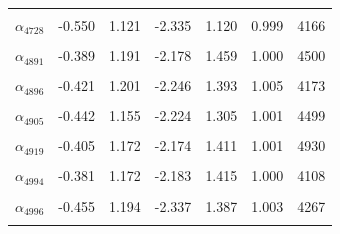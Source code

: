 \begin{longtable}{lrrrrrr}
\cellcolor{gray!10}{$\alpha_{4721}$} & \cellcolor{gray!10}{0.093} & \cellcolor{gray!10}{1.314} & \cellcolor{gray!10}{-1.688} & \cellcolor{gray!10}{2.359} & \cellcolor{gray!10}{1.003} & \cellcolor{gray!10}{1751}\\
$\alpha_{4728}$ & -0.550 & 1.121 & -2.335 & 1.120 & 0.999 & 4166\\
\cellcolor{gray!10}{$\alpha_{4885}$} & \cellcolor{gray!10}{-0.410} & \cellcolor{gray!10}{1.205} & \cellcolor{gray!10}{-2.245} & \cellcolor{gray!10}{1.421} & \cellcolor{gray!10}{1.002} & \cellcolor{gray!10}{4376}\\
$\alpha_{4891}$ & -0.389 & 1.191 & -2.178 & 1.459 & 1.000 & 4500\\
\cellcolor{gray!10}{$\alpha_{4892}$} & \cellcolor{gray!10}{-0.393} & \cellcolor{gray!10}{1.158} & \cellcolor{gray!10}{-2.181} & \cellcolor{gray!10}{1.349} & \cellcolor{gray!10}{1.002} & \cellcolor{gray!10}{4371}\\
$\alpha_{4896}$ & -0.421 & 1.201 & -2.246 & 1.393 & 1.005 & 4173\\
\cellcolor{gray!10}{$\alpha_{4902}$} & \cellcolor{gray!10}{-0.414} & \cellcolor{gray!10}{1.178} & \cellcolor{gray!10}{-2.237} & \cellcolor{gray!10}{1.355} & \cellcolor{gray!10}{1.001} & \cellcolor{gray!10}{4062}\\
$\alpha_{4905}$ & -0.442 & 1.155 & -2.224 & 1.305 & 1.001 & 4499\\
\cellcolor{gray!10}{$\alpha_{4912}$} & \cellcolor{gray!10}{-0.433} & \cellcolor{gray!10}{1.159} & \cellcolor{gray!10}{-2.241} & \cellcolor{gray!10}{1.379} & \cellcolor{gray!10}{1.003} & \cellcolor{gray!10}{4352}\\
$\alpha_{4919}$ & -0.405 & 1.172 & -2.174 & 1.411 & 1.001 & 4930\\
\cellcolor{gray!10}{$\alpha_{4920}$} & \cellcolor{gray!10}{-0.439} & \cellcolor{gray!10}{1.194} & \cellcolor{gray!10}{-2.222} & \cellcolor{gray!10}{1.371} & \cellcolor{gray!10}{1.002} & \cellcolor{gray!10}{4761}\\
$\alpha_{4994}$ & -0.381 & 1.172 & -2.183 & 1.415 & 1.000 & 4108\\
\cellcolor{gray!10}{$\alpha_{4995}$} & \cellcolor{gray!10}{-0.428} & \cellcolor{gray!10}{1.175} & \cellcolor{gray!10}{-2.275} & \cellcolor{gray!10}{1.351} & \cellcolor{gray!10}{1.002} & \cellcolor{gray!10}{3946}\\
$\alpha_{4996}$ & -0.455 & 1.194 & -2.337 & 1.387 & 1.003 & 4267\\
\cellcolor{gray!10}{$\alpha_{5073}$} & \cellcolor{gray!10}{-0.525} & \cellcolor{gray!10}{1.145} & \cellcolor{gray!10}{-2.335} & \cellcolor{gray!10}{1.170} & \cellcolor{gray!10}{1.001} & \cellcolor{gray!10}{4125}\\

\end{longtable}
